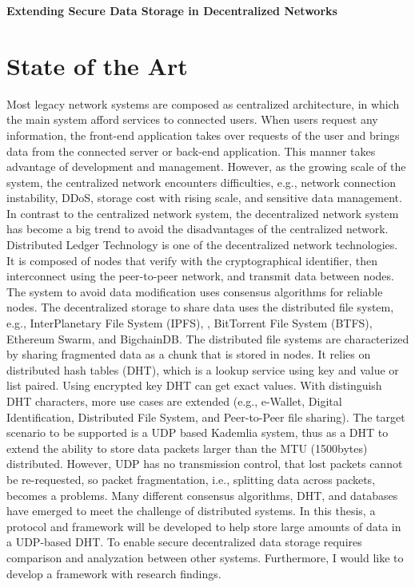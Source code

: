 \documentclass{article}
\begin{document}


{\huge  \textbf {Extending Secure Data Storage in Decentralized Networks}}\\
\section{State of the Art}
Most legacy network systems are composed as centralized architecture, in which the main system afford services to connected users. When users request any information, the front-end application takes over requests of the user and brings data from the connected server or back-end application. This manner takes advantage of development and management. However, as the growing scale of the system, the centralized network encounters difficulties, e.g., network connection instability, DDoS, storage cost with rising scale, and sensitive data management. In contrast to the centralized network system, the decentralized network system has become a big trend to avoid the disadvantages of the centralized network. 
Distributed Ledger Technology is one of the decentralized network technologies. It is composed of nodes that verify with the cryptographical identifier, then interconnect using the peer-to-peer network, and transmit data between nodes. The system to avoid data modification uses consensus algorithms for reliable nodes. The decentralized storage to share data uses the distributed file system, e.g., InterPlanetary File System (IPFS),  \cite{IPFS}\cite{benet2014ipfs}, BitTorrent File System (BTFS)\cite{BTFS}, Ethereum Swarm, and BigchainDB. The distributed file systems are characterized by sharing fragmented data as a chunk that is stored in nodes. It relies on distributed hash tables (DHT)\cite{sivaraja2008efficient}, which is a lookup service using key and value or list paired. Using encrypted key DHT can get exact values. With distinguish DHT characters, more use cases are extended (e.g., e-Wallet, Digital Identification, Distributed File System, and Peer-to-Peer file sharing). 
The target scenario to be supported is a UDP based Kademlia system\cite{maymounkov2002kademlia}, thus as a DHT to extend the ability to store data packets larger than the MTU (1500bytes) distributed\cite{ietf-intarea-frag-fragile-17}. However, UDP has no transmission control, that lost packets cannot be re-requested, so packet fragmentation, i.e., splitting data across packets, becomes a problems\cite{rfc791}\cite{rfc815}. 
Many different consensus algorithms, DHT, and databases have emerged to meet the challenge of distributed systems. In this thesis, a protocol and framework will be developed to help store large amounts of data in a UDP-based DHT. To enable secure decentralized data storage requires comparison and analyzation between other systems. Furthermore, I would like to develop a framework with research findings. 
\end{document}
